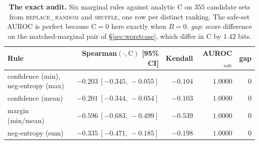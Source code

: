\begin{table}[!ht]
\centering
\footnotesize
\setlength{\tabcolsep}{4pt}
\begin{tabular}{lrrrr}
\toprule
Rule & Spearman$(\cdot,\mathrm{C})$ [95\% CI] & Kendall & AUROC$_{\mathrm{safe}}$ & gap \\
\midrule
confidence (min), neg-entropy (max) & $-0.203\ [-0.345,\, -0.055]$ & $-0.104$ & $1.0000$ & $0$ \\
confidence (mean) & $-0.201\ [-0.344,\, -0.054]$ & $-0.103$ & $1.0000$ & $0$ \\
margin (min/mean) & $-0.596\ [-0.683,\, -0.499]$ & $-0.539$ & $1.0000$ & $0$ \\
neg-entropy (sum) & $-0.335\ [-0.471,\, -0.185]$ & $-0.198$ & $1.0000$ & $0$ \\
\bottomrule
\end{tabular}
\caption{\textbf{The exact audit.} Six marginal rules against analytic $\mathrm{C}$ on $355$ candidate sets from \textsc{replace\_random} and \textsc{shuffle}, one row per distinct ranking. The safe-set AUROC is perfect because $\mathrm{C}=0$ here exactly when $B=0$. \emph{gap}: score difference on the matched-marginal pair of \S\ref{sec:worstcase}, which differ in $\mathrm{C}$ by $1.42$ bits.}
\label{tab:proxy}
\end{table}
